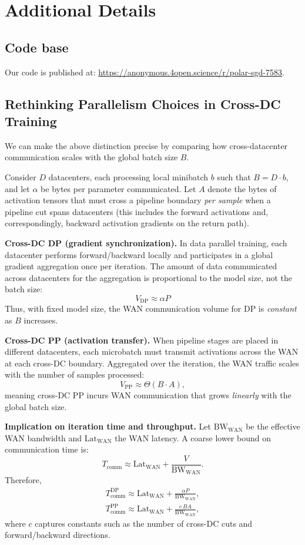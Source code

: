 \section{Additional Details}
\label{sec:appendix}

\subsection{Code base}
\label{app:code_base}
Our code is published at: \hyperlink{}{https://anonymous.4open.science/r/polar-sgd-7583}. 

\subsection{Rethinking Parallelism Choices in Cross-DC Training}
\label{app:rethink_parallelism}
We can make the above distinction precise by comparing how cross-datacenter communication scales with the global batch size $B$.

Consider $D$ datacenters, each processing local minibatch $b$ such that $B = D \cdot b$, and let $\alpha$ be bytes per parameter communicated. Let $A$ denote the bytes of activation tensors that must cross a pipeline boundary \emph{per sample} when a pipeline cut spans datacenters (this includes the forward activations and, correspondingly, backward activation gradients on the return path).

\textbf{Cross-DC DP (gradient synchronization).}
In data parallel training, each datacenter performs forward/backward locally and participates in a global gradient aggregation once per iteration. The amount of data communicated across datacenters for the aggregation is proportional to the model size, not the batch size:
\[
V_{\mathrm{DP}} \approx \alpha P
\]
Thus, with fixed model size, the WAN communication volume for DP is \emph{constant} as $B$ increases.

\textbf{Cross-DC PP (activation transfer).}
When pipeline stages are placed in different datacenters, each microbatch must transmit activations across the WAN at each cross-DC boundary. Aggregated over the iteration, the WAN traffic scales with the number of samples processed:
\[
V_{\mathrm{PP}} \approx \Theta(B \cdot A),
\]
meaning cross-DC PP incurs WAN communication that grows \emph{linearly} with the global batch size.

\textbf{Implication on iteration time and throughput.}
Let $\mathrm{BW}_{\mathrm{WAN}}$ be the effective WAN bandwidth and $\mathrm{Lat}_{\mathrm{WAN}}$ the WAN latency. A coarse lower bound on communication time is:
\[
T_{\mathrm{comm}} \approx \mathrm{Lat}_{\mathrm{WAN}} + \frac{V}{\mathrm{BW}_{\mathrm{WAN}}}.
\]
Therefore,
\begin{align*}
    T_{\mathrm{comm}}^{\mathrm{DP}} \approx \mathrm{Lat}_{\mathrm{WAN}} + \frac{\alpha P}{\mathrm{BW}_{\mathrm{WAN}}},\\
    T_{\mathrm{comm}}^{\mathrm{PP}} \approx \mathrm{Lat}_{\mathrm{WAN}} + \frac{c \, B A}{\mathrm{BW}_{\mathrm{WAN}}},
\end{align*}
where $c$ captures constants such as the number of cross-DC cuts and forward/backward directions.

